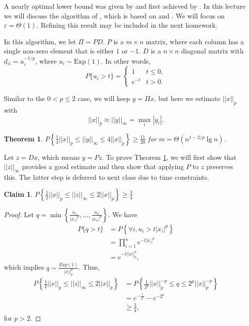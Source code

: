 \documentclass[11pt]{article}
\newtheorem{theorem}{Theorem}
\newtheorem{claim}{Claim}
\newcommand{\eps}{\varepsilon}
\begin{document}
A nearly optimal lower bound was given by \cite{BarYossef04} and first achieved by \cite{IW05}. In this lecture we will discuss the algorithm of \cite{Andoni12}, which is based on \cite{AKO11} and \cite{JST11}. We will focus on $\eps = \Theta(1)$. Refining this result may be included in the next homework.

In this algorithm, we let $\Pi=PD$. $P$ is a $m\times n$ matrix, where each column has a single non-zero element that is either $1$ or $-1$. $D$ is a $n\times n$ diagonal matrix with $d_{ii}=u_{i}^{-1/p}$, where $u_{i}\sim \text{Exp}(1)$. In other words, $$P\{u_{i}>t\}=\begin{cases}
1 & t\le0,\\
e^{-t} & t>0.
\end{cases}$$

Similar to the $0<p\le 2$ case, we will keep $y=\Pi x$, but here we estimate $||x||_p$ with
\begin{equation}
||x||_p \approx ||y||_{\infty}=\max_{i}|y_{i}|.
\end{equation}

\begin{theorem} \label{thm:andoni}
$P\left\{\frac{1}{4}||x||_{p}\le||y||_{\infty}\le4||x||_{p}\right\}\ge\frac{11}{20}$ for $m=\Theta(n^{1-2/p}\lg n)$.
\end{theorem}

Let $z=Dx$, which means $y=Pz$. To prove Theorem \ref{thm:andoni}, we will first show that $||z||_\infty$ provides a good estimate and then show that applying $P$ to $z$ preserves this. The latter step is deferred to next class due to time constraints.

\begin{claim}
$P\left\{ \frac{1}{2}||x||_{p}\le||z||_{\infty}\le2||x||_{p} \right\}\ge\frac{3}{4}$
\end{claim}
\begin{proof}
Let $q=\min\left\{\frac{u_{1}}{|x_{1}|^{p}},\dots,\frac{u_{n}}{|x_{n}|^{p}}\right\}$. We have 
\begin{align}
P\{q>t\} & = P\left\{ \forall i,u_{i}>t|x_{i}|^{p} \right\}\\
 & = \prod_{i=1}^ne^{-t|x_{i}|^{p}}\\
 & = e^{-t||x||_{p}^{p}},
\end{align}
which implies $q\sim \frac{Exp(1)}{|x||_{p}^{p}}$. Thus,
\begin{align}
P\left\{\frac{1}{2}||x||_{p}\le||z||_{\infty}\le2||x||_{p}\right\} &= P\left\{\frac{1}{2^{p}}||x||_{p}^{-p}\le q\le2^{p}||x||_{p}^{-p}\right\} \\
&=e^{-\frac{1}{2^{p}}}-e^{-2^{p}} \\
&\ge\frac{3}{4},
\end{align}
for $p>2$.

\end{proof}
\end{document}
